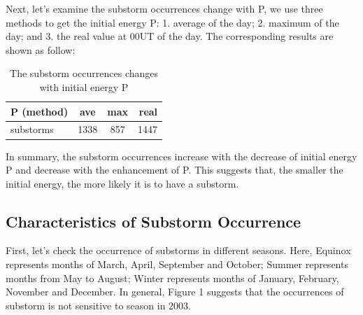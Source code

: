 \documentclass[12pt, letterpaper]{article} %
\begin{document}
Next, let's examine the substorm occurrences change with P, we use three methods to get the initial energy P: 1. average of the day; 2. maximum of the day; and 3. the real value at 00UT of the day. The corresponding results are shown as follow:


\begin{table}[!h] %
  \begin{center} %
  \begin{tabular}{|l|c|c|r|} %
    \hline %
    P (method) & ave & max &  real\\ %
    \hline %
    \hline %
    substorms & 1338 & 857 & 1447\\ %
    \hline %
  \end{tabular} %
  \caption{The substorm occurrences changes with initial energy P} %
  \label{tab:tab2} %
  \end{center} %
\end{table} %

In summary, the substorm occurrences increase with the decrease of initial energy P and decrease with the enhancement of P. This suggests that, the smaller the initial energy, the more likely it is to have a substorm. 

\subsection{Characteristics of Substorm Occurrence} %
First, let's check the occurrence of substorms in different seasons. Here, Equinox represents months of March, April, September and October; Summer represents months from May to August; Winter represents months of January, February, November and December. In general, Figure 1 suggests that the occurrences of substorm is not sensitive to season in 2003.
\end{document}

